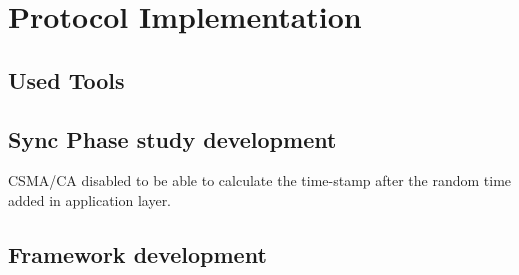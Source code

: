\chapter{Protocol Implementation}
\label{chap:protocolimplementation}

\section{Used Tools}

\section{Sync Phase study development}

\ac{CSMA/CA} disabled to be able to calculate the time-stamp after the random time added in application layer.

\section{Framework development}
